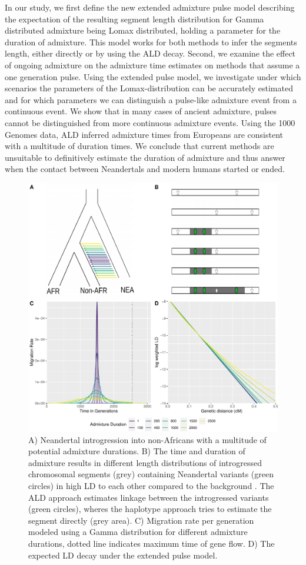 \documentclass[]{article}
\begin{document}
In our study, we first define the new extended admixture pulse model describing the expectation of the resulting segment length distribution for Gamma distributed admixture being Lomax distributed, holding a parameter for the duration of admixture. This model works for
both methods to infer the segments length, either directly or by using
the ALD decay. Second, we examine the effect of ongoing admixture on the admixture time estimates on methods that assume a one generation pulse. Using the extended pulse model, we investigate under which scenarios the parameters of the Lomax-distribution can be accurately estimated and for which parameters we can distinguish a pulse-like admixture event from a continuous event. We show that in many cases of ancient admixture, pulses cannot be distinguished from more continuous admixture events. Using the 1000 Genomes data, ALD inferred admixture times from Europeans are consistent with a multitude of duration times.
We conclude that current methods are unsuitable to definitively estimate the duration of admixture and thus answer when the contact between Neandertals and modern humans started or ended.

\begin{figure}
\centering
\includegraphics{Admixture_Time_Inference_Paper_Draft_files/figure-latex/fig1-1.pdf}
\caption{\label{fig:fig1} A) Neandertal introgression into non-Africans with a multitude of potential admixture durations. B) The time and duration of admixture results in different length distributions of introgressed chromosomal segments (grey) containing  Neandertal variants (green circles)  in high LD to each other
compared to the background . The ALD approach estimates linkage
between the introgressed variants (green circles), wheres the haplotype approach tries
to estimate the segment directly (grey area). C) Migration rate per generation
modeled using a Gamma distribution for different admixture durations,
dotted line indicates maximum time of gene flow. D) The expected LD
decay under the extended pulse model.}
\end{figure}
\end{document}
